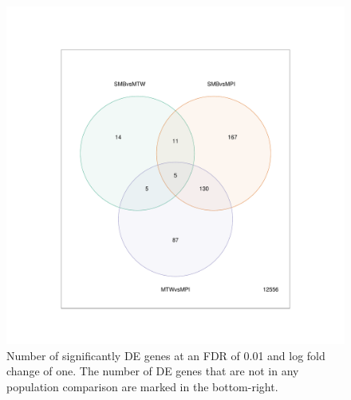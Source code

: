 \documentclass[12pt,a4paper,titlepage,twoside,openright]{book}
\begin{document}
\begin{mainmatter}
\begin{figure}[htb!]
\centering
\includegraphics[width=\textwidth,height=\textheight,keepaspectratio]{vennDiagram_allSigDEGenes_pval01_FDR1_dupCor.pdf}
\caption{Number of significantly DE genes at an FDR of 0.01 and log fold change of one. The number of DE genes that are not in any population comparison are marked in the bottom-right.}
\label{fig:Venn Diagram between Islands}
\end{figure}


\end{mainmatter}
\end{document}
